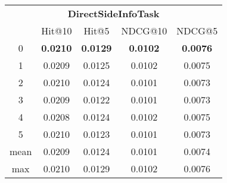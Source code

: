 \documentclass{article}
\begin{document}
 

\begin{tabular}{c|cccc}

\multicolumn{5}{c}{\textbf{DirectSideInfoTask}} \\
\noalign{\smallskip}
\noalign{\smallskip}
\toprule
\multicolumn{1}{c}{Template ID} & \multicolumn{1}{|c}{Hit@10} & \multicolumn{1}{c}{Hit@5} & \multicolumn{1}{c}{NDCG@10} & \multicolumn{1}{c}{NDCG@5} \\
\midrule
0 & \textbf{0.0210} & \textbf{0.0129} & \textbf{0.0102} & \textbf{0.0076} \\
1 & 0.0209 & 0.0125 & 0.0102 & 0.0075 \\
2 & 0.0210 & 0.0124 & 0.0101 & 0.0073 \\
3 & 0.0209 & 0.0122 & 0.0101 & 0.0073 \\
4 & 0.0208 & 0.0124 & 0.0102 & 0.0075 \\
5 & 0.0210 & 0.0123 & 0.0101 & 0.0073 \\
\midrule
mean & 0.0209 & 0.0124 & 0.0101 & 0.0074 \\
max & 0.0210 & 0.0129 & 0.0102 & 0.0076 \\
\bottomrule

\end{tabular}
\end{document}
